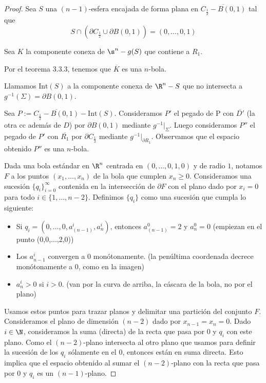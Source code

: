 \begin{proof}
Sea $S$ una $(n-1)$-esfera encajada de forma plana en $\overline{C_\frac{1}{2}-B(0,1)}$ tal que $$S\cap \left(\partial C_\frac{1}{2}\cup\partial B(0,1)\right)=(0,\dots,0,1)$$ 

Sea $K$ la componente conexa de $\s^n-g(S)$ que contiene a $R_1$. 

Por el teorema 3.3.3, tenemos que $\overline{K}$ es una $n$-bola.

Llamamos $\text{Int}(S)$ a la componente conexa de $\R^n - S$ que no intersecta a $g^{-1}(\Sigma)=\partial B(0,1)$. 

Sea $P:=\overline{C_\frac{1}{2}-B(0,1)}-\text{Int}(S)$. Consideramos $P'$ el pegado de P con $\overline{D'}$ (la otra cc además de $D$) por $\partial B(0,1)$ mediante $g^{-1}|_\Sigma$. Luego consideramos $P''$ el pegado de $P'$ con $\overline{R_1}$ por $\partial C_\frac{1}{2}$ mediante $g^{-1}|_{\partial R_1}$. Observamos que el espacio obtenido $P''$ es una $n$-bola. 


Dada una bola estándar en $\R^n$ centrada en $(0,\dots,0,1,0)$ y de radio $1$, notamos $F$ a los puntos $(x_1,\dots,x_n)$ de la bola que cumplen $x_n\geq 0$. Consideramos una sucesión $\{q_i\}_{i=0}^\infty$ contenida en la intersección de $\partial F$ con el plano dado por $x_i=0$ para todo $i\in\{1,\dots,n-2\}$. Definimos $\{q_i\}$ como una sucesión que cumpla lo siguiente:\begin{itemize}
\item Si $q_i=(0,\dots,0,a_{(n-1)}^i, a_n^i)$, entonces $a_{(n-1)}^0 = 2$ y $a_{n}^0=0$ (empiezan en el punto (0,0,...,2,0))
\item Los $a_{n-1}^i$ convergen a $0$ monótonamente. (la penúltima coordenada decrece monótonamente a $0$, como en la imagen)
\item $a_n^i > 0$ si $i>0$. (van por la curva de arriba, la cáscara de la bola, no por el plano)
\end{itemize}

Usamos estos puntos para trazar planos y delimitar una partición del conjunto $F$. Consideramos el plano de dimensión $(n-2)$ dado por $x_{n-1}=x_n=0$. Dado $i\in\N$, consideramos la suma (directa) de la recta que pasa por $0$ y $q_i$ con este plano. Como el $(n-2)$-plano intersecta al otro plano que usamos para definir la sucesión de los $q_i$ sólamente en el $0$, entonces están en suma directa. Esto implica que el espacio obtenido al sumar el $(n-2)$-plano con la recta que pasa por $0$ y $q_i$ es un $(n-1)$-plano.


\end{proof}
